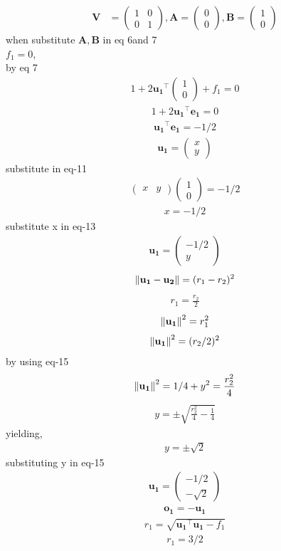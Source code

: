\documentclass[10pt, a4paper]{article}
\newcommand{\myvec}[1]{\ensuremath{\begin{pmatrix}#1\end{pmatrix}}}
\let\vec\mathbf
\begin{document}
\begin{align}
\vec{V} &= \myvec{1 & 0\\0 & 1},\vec{A}= \myvec{0\\0} ,\vec{B}= \myvec{1\\0}
\end{align}
when  substitute $\vec{A},\vec{B}$ in eq 6and 7\\
$f_1=0$,\\
by eq 7
\begin{align}
1+2\vec{u_1}^{\top}\myvec{1\\0}+f_1=0
\end{align}
\begin{align}
1+2\vec{u_1}^{\top}\vec{e_1}=0
\end{align}
\begin{align}
\vec{u_1}^{\top}\vec{e_1}=-1/2
\end{align}
\begin{align}
\vec{u_1}=\myvec{x\\y}
\end{align}
substitute in eq-11
\begin{align}
\myvec{x&y}\myvec{1\\0}=-1/2
\end{align}
\begin{align}
x=-1/2
\end{align}
substitute x in eq-13
\begin{align}
\vec{u_1}=\myvec{-1/2\\y}
\end{align}
\begin{align}
\norm{\vec{u_1}-\vec{u_2}}=(r_1-r_2)^2
\end{align}
\begin{align}
r_1=\frac{r_2}{2}
\end{align}
\begin{align}
\norm{\vec{u_1}}^2=r_1^2
\end{align}
\begin{align}
\norm{\vec{u_1}}^2=(r_2/2)^2
\end{align}
by using eq-15\\
\begin{align}
\norm{\vec{u_1}}^2=1/4+y^2=\frac{r_2^2}{4}
\end{align}
\begin{align}
y=\pm\sqrt{\frac{r_2^2}{4}-\frac{1}{4}}
\end{align}
yielding,
\begin{align}
y=\pm\sqrt{2}
\end{align}
substituting y in eq-15\\
\begin{align}
\vec{u_1}=\myvec{-1/2\\-\sqrt{2}}
\end{align}
\begin{align}
\vec{o_1}=\vec{-u_1}
\end{align}
\begin{align}
r_1=\sqrt{{\vec{u_1}^{\top}\vec{u_1}}-f_1 }
\end{align}
\begin{align}
{r_1}=3/2
\end{align}
\end{document}
